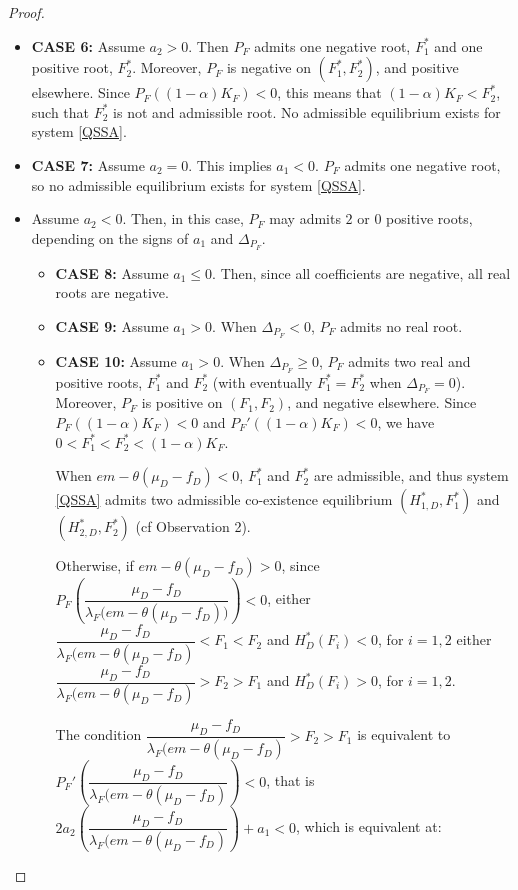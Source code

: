 \documentclass{article}
\newcommand{\lfw}{\lambda_{F}}
\newcommand{\lfw}{\lambda_{F}}
\begin{document}
\begin{proof}
\begin{itemize}
\begin{itemize}
\item \textbf{CASE 6:} Assume $a_2>0$. Then $P_F$ admits one negative root, $F_1^*$ and one positive root, $F_2^*$. Moreover, $P_F$ is negative on $(F_1^*, F_2^*)$, and positive elsewhere. Since $P_F((1-\alpha) K_F) < 0$, this means that $(1-\alpha) K_F < F_2^*$, such that $F^*_2$ is not and admissible root. No admissible equilibrium exists for system \eqref{QSSA}.
\item \textbf{CASE 7:} Assume $a_2 = 0$. This implies $a_1 < 0$. $P_F$ admits one negative root, so no admissible equilibrium exists for system \eqref{QSSA}.
\item Assume $a_2<0$. Then, in this case, $P_F$ may admits $2$ or $0$ positive roots, depending on the signs of $a_1$ and $\Delta_{P_F}$.
\begin{itemize}
\item \textbf{CASE 8:} Assume $a_1\leq0$. Then, since all coefficients are negative, all real roots are negative.
\item \textbf{CASE 9:} Assume $a_1>0$. When $\Delta_{P_F} < 0$, $P_F$ admits no real root.

\item \textbf{CASE 10:} Assume $a_1>0$. When $\Delta_{P_F} \geq 0$, $P_F$ admits two real and positive roots, $F_1^*$ and $F_2^*$ (with eventually $F_1^* = F_2^*$ when $\Delta_{P_F} = 0$). Moreover, $P_F$ is positive on $(F_1, F_2)$, and negative elsewhere. Since $P_F((1-\alpha) K_F) < 0$ and $P_F'((1-\alpha) K_F) < 0$, we have $0 < F_1^* < F^*_2 < (1-\alpha) K_F$.

\medskip

When $e m - \theta(\mu_D - f_D) < 0$, $F^*_1$ and $F^*_2$ are admissible, and thus system \eqref{QSSA} admits two admissible co-existence equilibrium $(H_{1,D}^*,F_1^*)$ and $(H_{2,D}^*,F_2^*)$ (cf Observation 2). 

Otherwise, if $e m - \theta(\mu_D - f_D)  > 0$, since $P_F\left(\dfrac{\mu_D - f_D}{\lfw \Big(e m - \theta (\mu_D - f_D)\Big)} \right) < 0$, either $\dfrac{\mu_D - f_D}{\lfw \Big(e m - \theta (\mu_D - f_D)} < F_1 < F_2$ and $H_D^*(F_i) < 0$, for $i = 1,2$ either $\dfrac{\mu_D - f_D}{\lfw \Big(e m - \theta (\mu_D - f_D)} > F_2 > F_1$ and $H_D^*(F_i) > 0$, for $i = 1,2$. 

The condition $\dfrac{\mu_D - f_D}{\lfw \Big(e m - \theta (\mu_D - f_D)} > F_2 > F_1$ is equivalent to $P_F'\left(\dfrac{\mu_D - f_D}{\lfw \Big(e m - \theta (\mu_D - f_D)}\right) < 0$, that is $2a_2\left(\dfrac{\mu_D - f_D}{\lfw \Big(e m - \theta (\mu_D - f_D)}\right) + a_1 < 0$, which is equivalent at:


\end{itemize}
\end{itemize}
\end{itemize}
\end{proof}
\end{document}
